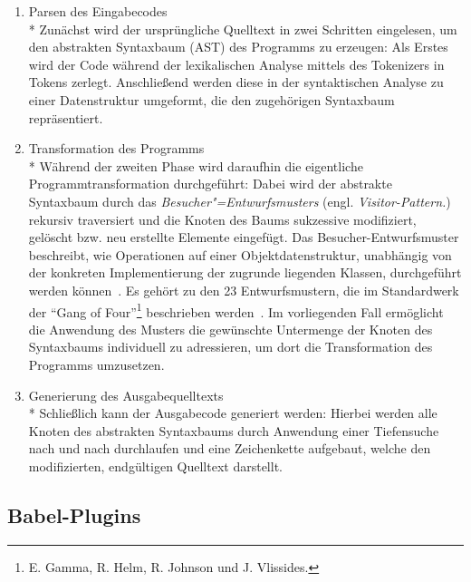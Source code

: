 \begin{enumerate}
  \item {\libertineSB Parsen des Eingabecodes}\\*
    Zunächst wird der ursprüngliche Quelltext in zwei Schritten eingelesen, um den abstrakten Syntaxbaum (AST) des Programms zu erzeugen: Als Erstes wird der Code während der lexikalischen Analyse mittels des Tokenizers in Tokens zerlegt. Anschließend werden diese in der syntaktischen Analyse zu einer Datenstruktur umgeformt, die den zugehörigen Syntaxbaum repräsentiert.
    \\

  \item {\libertineSB Transformation des Programms}\\*
    Während der zweiten Phase wird daraufhin die eigentliche Programmtransformation durchgeführt: Dabei wird der abstrakte Syntaxbaum durch das \textit{Besucher"=Entwurfsmusters} (engl. \textit{Visitor-Pattern.}) rekursiv traversiert und die Knoten des Baums sukzessive modifiziert, gelöscht bzw. neu erstellte Elemente eingefügt. Das Besucher-Entwurfsmuster beschreibt, wie Operationen auf einer Objektdatenstruktur, unabhängig von der konkreten Implementierung der zugrunde liegenden Klassen, durchgeführt werden können~\autocite[634\psq]{Freeman:2004}.
    Es gehört zu den 23 Entwurfsmustern, die im Standardwerk  der \enquote{Gang of Four}\footnote{E. Gamma, R. Helm, R. Johnson und J. Vlissides.} beschrieben werden~\autocite[306\psqq]{GAMMA:1994}. Im vorliegenden Fall ermöglicht die Anwendung des Musters die gewünschte Untermenge der Knoten des Syntaxbaums individuell zu adressieren, um dort die Transformation des Programms umzusetzen.
    \\

  \item {\libertineSB Generierung des Ausgabequelltexts}\\*
    Schließlich kann der Ausgabecode generiert werden: Hierbei werden alle Knoten des abstrakten Syntaxbaums durch Anwendung einer Tiefensuche nach und nach durchlaufen und eine Zeichenkette aufgebaut, welche den modifizierten, endgültigen Quelltext darstellt.
\end{enumerate}

\subsection{Babel-Plugins}
\label{subsection:babel-plugins}


